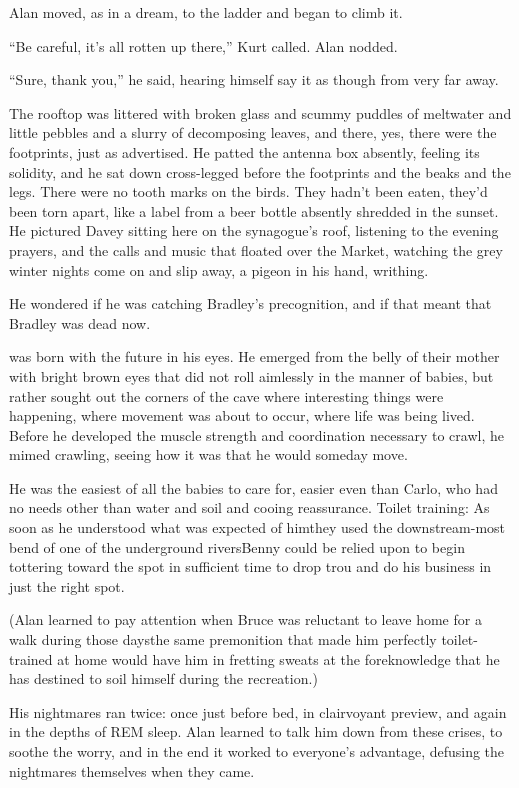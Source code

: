 Alan moved, as in a dream, to the ladder and began to climb it.

``Be careful, it's all rotten up there,'' Kurt called.  Alan nodded.

``Sure, thank you,'' he said, hearing himself say it as though from
very far away.

The rooftop was littered with broken glass and scummy puddles of
meltwater and little pebbles and a slurry of decomposing leaves, and
there, yes, there were the footprints, just as advertised.  He patted
the antenna box absently, feeling its solidity, and he sat down
cross-legged before the footprints and the beaks and the legs.  There
were no tooth marks on the birds.  They hadn't been eaten, they'd been
torn apart, like a label from a beer bottle absently shredded in the
sunset.  He pictured Davey sitting here on the synagogue's roof,
listening to the evening prayers, and the calls and music that floated
over the Market, watching the grey winter nights come on and slip
away, a pigeon in his hand, writhing.

He wondered if he was catching Bradley's precognition, and if that
meant that Bradley was dead now.

 was born with the future in his eyes.  He emerged from the
belly of their mother with bright brown eyes that did not roll
aimlessly in the manner of babies, but rather sought out the corners
of the cave where interesting things were happening, where movement
was about to occur, where life was being lived.  Before he developed
the muscle strength and coordination necessary to crawl, he mimed
crawling, seeing how it was that he would someday move.

He was the easiest of all the babies to care for, easier even than
Carlo, who had no needs other than water and soil and cooing
reassurance.  Toilet training:  As soon as he understood what was
expected of him\dash{}they used the downstream-most bend of one of the
underground rivers\dash{}Benny could be relied upon to begin tottering
toward the spot in sufficient time to drop trou and do his business in
just the right spot.

(Alan learned to pay attention when Bruce was reluctant to leave home
for a walk during those days\dash{}the same premonition that made him
perfectly toilet-trained at home would have him in fretting sweats at
the foreknowledge that he has destined to soil himself during the
recreation.)

His nightmares ran twice:  once just before bed, in clairvoyant
preview, and again in the depths of REM sleep.  Alan learned to talk
him down from these crises, to soothe the worry, and in the end it
worked to everyone's advantage, defusing the nightmares themselves
when they came.

